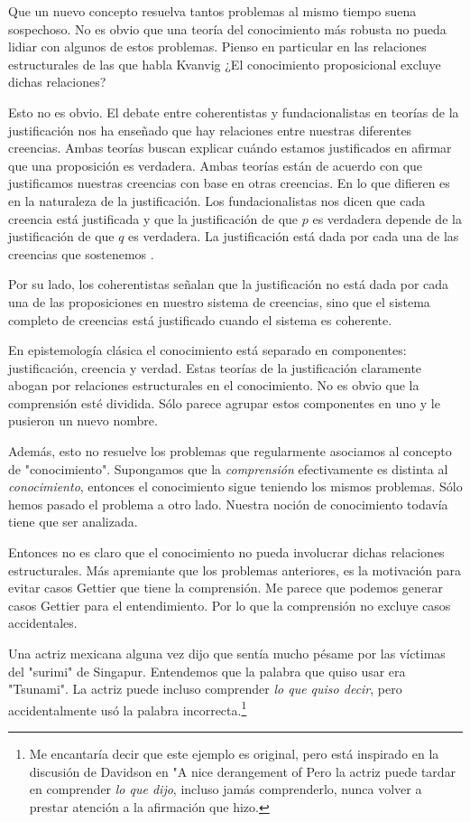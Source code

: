 {Que un nuevo concepto resuelva tantos problemas al mismo tiempo suena sospechoso.
No es obvio que una teoría del conocimiento más robusta no pueda lidiar con algunos de estos problemas.
Pienso en particular en las relaciones estructurales de las que habla Kvanvig ¿El conocimiento proposicional excluye dichas relaciones?

Esto no es obvio. El debate entre coherentistas y fundacionalistas en teorías de la justificación nos ha enseñado que hay relaciones entre nuestras diferentes creencias.
Ambas teorías buscan explicar cuándo estamos justificados en afirmar que una proposición es verdadera.
Ambas teorías están de acuerdo con que justificamos nuestras creencias con base en otras creencias.
En lo que difieren es en la naturaleza de la justificación.
Los fundacionalistas nos dicen que cada creencia está justificada y que la justificación de que $p$ es verdadera depende de la justificación de que $q$ es verdadera.
La justificación está dada por cada una de las creencias que sostenemos .

Por su lado, los coherentistas señalan que la justificación no está dada por cada una de las proposiciones en nuestro sistema de creencias, sino que el sistema completo de creencias está justificado cuando el sistema es coherente. %

En epistemología clásica el conocimiento está separado en componentes: justificación, creencia y verdad.
Estas teorías de la justificación claramente abogan por relaciones estructurales en el conocimiento.
No es obvio que la comprensión esté dividida. Sólo parece agrupar estos componentes en uno y le pusieron un nuevo nombre.

Además, esto no resuelve los problemas que regularmente asociamos al concepto de "conocimiento".
Supongamos que la \emph{comprensión} efectivamente es distinta al \emph{conocimiento}, entonces el conocimiento sigue teniendo los mismos problemas.
Sólo hemos pasado el problema a otro lado.
Nuestra noción de conocimiento todavía tiene que ser analizada.

Entonces no es claro que el conocimiento no pueda involucrar dichas relaciones estructurales.
Más apremiante que los problemas anteriores, es la motivación para evitar casos Gettier que tiene la comprensión.
Me parece que podemos generar casos Gettier para el entendimiento.
Por lo que la comprensión no excluye casos accidentales.

Una actriz mexicana alguna vez dijo que sentía mucho pésame por las víctimas del "surimi" de Singapur.
Entendemos que la palabra que quiso usar era "Tsunami".
La actriz puede incluso comprender \emph{lo que quiso decir}, pero accidentalmente usó la palabra incorrecta.\footnote{Me encantaría decir que este ejemplo es original, pero está inspirado en la discusión de Davidson en "A nice derangement of %
Pero la actriz puede tardar en comprender \emph{lo que dijo}, incluso jamás comprenderlo, nunca volver a prestar atención a la afirmación que hizo.

}}
